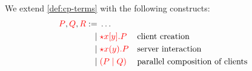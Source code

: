 \begin{definition}[Terms]\label{def:nc-terms}
  We extend \cref{def:cp-terms} with the following constructs:
  \[\!
    \begin{aligned}
      \textcolor{red}{P}, \textcolor{red}{Q}, \textcolor{red}{R}
           :=& \; \dots
      \\ \mid& \; \textcolor{red}{{\star}{x}[y].P} &&\text{client creation}
      \\ \mid& \; \textcolor{red}{{\star}{x}(y).P} &&\text{server interaction}
      \\ \mid& \; \textcolor{red}{(P \mid Q)}   &&\text{parallel composition of clients}
    \end{aligned}
  \]
\end{definition}
